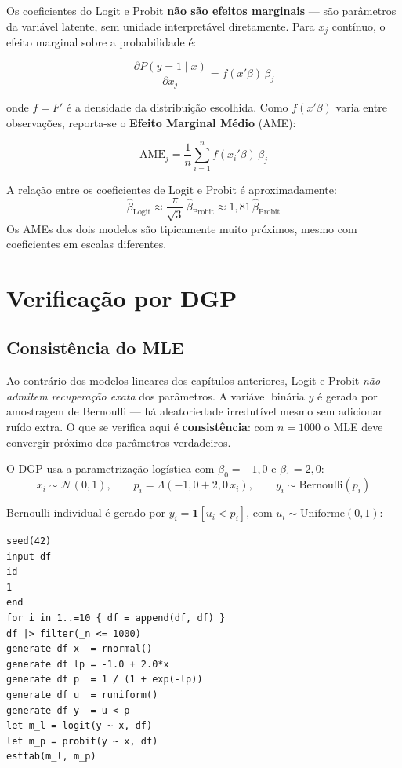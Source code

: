 Os coeficientes do Logit e Probit \textbf{não são efeitos marginais} — são
parâmetros da variável latente, sem unidade interpretável diretamente.
Para $x_j$ contínuo, o efeito marginal sobre a probabilidade é:

\[
  \frac{\partial P(y=1 \mid x)}{\partial x_j}
  = f(x'\beta)\,\beta_j
\]

onde $f = F'$ é a densidade da distribuição escolhida. Como $f(x'\beta)$
varia entre observações, reporta-se o \textbf{Efeito Marginal Médio} (AME):

\[
  \mathrm{AME}_j = \frac{1}{n}\sum_{i=1}^{n} f(x_i'\beta)\,\beta_j
\]

\begin{nota}
  A relação entre os coeficientes de Logit e Probit é aproximadamente:
  \[
    \hat\beta_{\mathrm{Logit}} \approx \frac{\pi}{\sqrt{3}}\,\hat\beta_{\mathrm{Probit}}
    \approx 1{,}81\,\hat\beta_{\mathrm{Probit}}
  \]
  Os AMEs dos dois modelos são tipicamente muito próximos, mesmo com
  coeficientes em escalas diferentes.
\end{nota}

\section{Verificação por DGP}

\subsection*{Consistência do MLE}

Ao contrário dos modelos lineares dos capítulos anteriores, Logit e Probit
\emph{não admitem recuperação exata} dos parâmetros. A variável binária $y$
é gerada por amostragem de Bernoulli — há aleatoriedade irredutível mesmo
sem adicionar ruído extra. O que se verifica aqui é \textbf{consistência}:
com $n=1000$ o MLE deve convergir próximo dos parâmetros verdadeiros.

O DGP usa a parametrização logística com $\beta_0 = -1{,}0$ e $\beta_1 = 2{,}0$:
\[
  x_i \sim \mathcal{N}(0,1), \qquad
  p_i = \Lambda(-1{,}0 + 2{,}0\,x_i), \qquad
  y_i \sim \mathrm{Bernoulli}(p_i)
\]

Bernoulli individual é gerado por $y_i = \mathbf{1}[u_i < p_i]$, com
$u_i \sim \mathrm{Uniforme}(0,1)$:

\begin{lstlisting}[caption={DGP logístico — Logit e Probit simultâneos}]
seed(42)
input df
id
1
end
for i in 1..=10 { df = append(df, df) }
df |> filter(_n <= 1000)
generate df x  = rnormal()
generate df lp = -1.0 + 2.0*x
generate df p  = 1 / (1 + exp(-lp))
generate df u  = runiform()
generate df y  = u < p
let m_l = logit(y ~ x, df)
let m_p = probit(y ~ x, df)
esttab(m_l, m_p)
\end{lstlisting}


